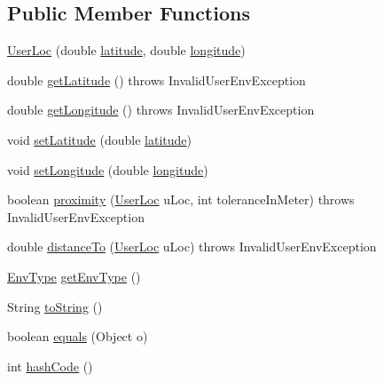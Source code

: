 \subsection*{\-Public \-Member \-Functions}
\begin{DoxyCompactItemize}
\item 
\hyperlink{classlab_1_1davidahn_1_1appshuttle_1_1collect_1_1env_1_1_user_loc_a0ea1cf554711f510cab11c151c5610aa}{\-User\-Loc} (double \hyperlink{classlab_1_1davidahn_1_1appshuttle_1_1collect_1_1env_1_1_user_loc_a7900a5ce3f780361734f0ae790913997}{latitude}, double \hyperlink{classlab_1_1davidahn_1_1appshuttle_1_1collect_1_1env_1_1_user_loc_a04684fd186120d620f7552d99a0184cb}{longitude})
\item 
double \hyperlink{classlab_1_1davidahn_1_1appshuttle_1_1collect_1_1env_1_1_user_loc_afd39450f634ad95d3f9c22d0a2d331bd}{get\-Latitude} ()  throws Invalid\-User\-Env\-Exception 
\item 
double \hyperlink{classlab_1_1davidahn_1_1appshuttle_1_1collect_1_1env_1_1_user_loc_ad6cbe28eb279b1f7730caeca2b5dfaa5}{get\-Longitude} ()  throws Invalid\-User\-Env\-Exception 
\item 
void \hyperlink{classlab_1_1davidahn_1_1appshuttle_1_1collect_1_1env_1_1_user_loc_aa9759cc2ef9d7e4666fba12c44488abf}{set\-Latitude} (double \hyperlink{classlab_1_1davidahn_1_1appshuttle_1_1collect_1_1env_1_1_user_loc_a7900a5ce3f780361734f0ae790913997}{latitude})
\item 
void \hyperlink{classlab_1_1davidahn_1_1appshuttle_1_1collect_1_1env_1_1_user_loc_a747e5f600300b932abf68613f8dbc516}{set\-Longitude} (double \hyperlink{classlab_1_1davidahn_1_1appshuttle_1_1collect_1_1env_1_1_user_loc_a04684fd186120d620f7552d99a0184cb}{longitude})
\item 
boolean \hyperlink{classlab_1_1davidahn_1_1appshuttle_1_1collect_1_1env_1_1_user_loc_ac975850a9104600a084ab2daf2f89f81}{proximity} (\hyperlink{classlab_1_1davidahn_1_1appshuttle_1_1collect_1_1env_1_1_user_loc}{\-User\-Loc} u\-Loc, int tolerance\-In\-Meter)  throws Invalid\-User\-Env\-Exception 
\item 
double \hyperlink{classlab_1_1davidahn_1_1appshuttle_1_1collect_1_1env_1_1_user_loc_ad36c63363171d1c8d618010760e694b2}{distance\-To} (\hyperlink{classlab_1_1davidahn_1_1appshuttle_1_1collect_1_1env_1_1_user_loc}{\-User\-Loc} u\-Loc)  throws Invalid\-User\-Env\-Exception 
\item 
\hyperlink{enumlab_1_1davidahn_1_1appshuttle_1_1collect_1_1env_1_1_env_type}{\-Env\-Type} \hyperlink{classlab_1_1davidahn_1_1appshuttle_1_1collect_1_1env_1_1_user_loc_a1efa134895fa56c9860a942de156fe4c}{get\-Env\-Type} ()
\item 
\-String \hyperlink{classlab_1_1davidahn_1_1appshuttle_1_1collect_1_1env_1_1_user_loc_a6ed270496491ed719da528de0ae7f72f}{to\-String} ()
\item 
boolean \hyperlink{classlab_1_1davidahn_1_1appshuttle_1_1collect_1_1env_1_1_user_loc_a9c77841504315e3a1872b1ea743087fc}{equals} (\-Object o)
\item 
int \hyperlink{classlab_1_1davidahn_1_1appshuttle_1_1collect_1_1env_1_1_user_loc_af2925278e446e6403ba29862ec401aa5}{hash\-Code} ()
\end{DoxyCompactItemize}
